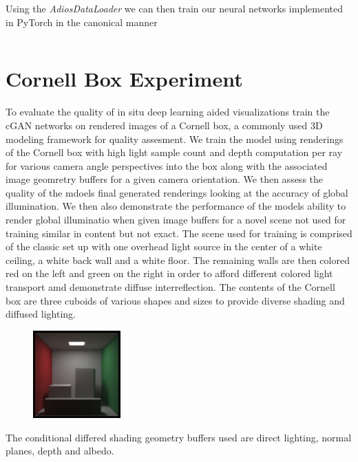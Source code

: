\documentclass[sigconf,authordraft]{acmart}
\begin{document}

Using the {\it AdiosDataLoader} we can then train our neural networks implemented in PyTorch in the canonical manner

\inputminted{python}{pytorchDataLoader.py}


\section{Cornell Box Experiment}

To evaluate the quality of in situ deep learning aided visualizations train the cGAN networks on rendered images of a Cornell box, a commonly used 3D modeling framework for quality assesment. We train the model using renderings of the Cornell box with high light sample count and depth computation per ray for various camera angle perspectives into the box along with the associated image geomretry buffers for a given camera orientation. We then assess the quality of the mdoels final generated renderings looking at the accuracy of global illumination. We then also demonstrate the performance of the models ability to render global illuminatio when given image buffers for a novel scene not used for training similar in content but not exact. The scene used for training is comprised of the classic set up with one overhead light source in the center of a white ceiling, a white back wall and a white floor. The remaining walls are then colored red on the left and green on the right in order to afford different colored light transport amd demonstrate diffuse interreflection. The contents of the Cornell box are three cuboids of various shapes and sizes to provide diverse shading and diffused lighting. 

\begin{figure}[h]
\includegraphics[width=0.3\textwidth]{sc-1080-d-45.png}
\end{figure}

The conditional differed shading geometry buffers used are direct lighting, normal planes, depth and albedo. 
\end{document}
